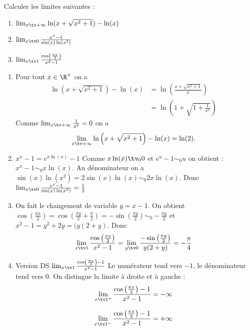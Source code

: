 



\begin{exercice}
Calculer les limites suivantes : 

\begin{enumerate}
\item $\lim_{x\tv+\infty} \ln(x+\sqrt{x^2 +1}) -\ln(x)$\\

\item $\lim_{x\tv 0} \frac{x^x-1}{\sin(x)\ln(x^2)}$
\item $\lim_{x\tv 1} \frac{\cos\left(\frac{\pi x}{2}\right)}{x^2-1}$
\end{enumerate}
\end{exercice}



\begin{correction}
\begin{enumerate}

\item  Pour tout $x\in \R^+$ on a 
\begin{align*}
 \ln\left(x+\sqrt{x^2+1}\right) -\ln(x)  
							&= \ln\left(\frac{x+\sqrt{x^2+1}}{x}\right)  \\
							&= \ln\left(1+\sqrt{1+\frac{1}{x^2}}\right)  
\end{align*}
Comme $\lim_{x\tv+\infty} \frac{1}{x^2}=0$ on a 
$$\lim_{x\tv+\infty} \ln\left(x+\sqrt{x^2+1}\right) -\ln(x)  =\ln(2).$$

\item $x^x-1 = e^{x\ln(x) }-1 $ Comme $x\ln(x)\tv_0 0 $ et $e^u-1 \sim_0 u$  on obtient : $x^x-1 \sim_0 x\ln(x)$.
Au dénominateur on a  $\sin(x )\ln(x^2) =2\sin(x)\ln(x) \sim_0 2x \ln(x)$. 
Donc $\lim_{x\tv 0} \frac{x^x-1}{\sin(x)\ln(x^2)} = \frac{1}{2}$

\item On fait le changement de variable $y=x-1$. On obtient 
$\cos\left(\frac{\pi x}{2}\right) = \cos\left( \frac{\pi y}{2} +\frac{\pi}{2} \right) = -\sin\left(\frac{\pi y}{2}\right)\sim_0 -\frac{\pi y}{2}$
et $x^2 - 1 = y^2 +2y=(y(2+y) $. Donc 
$$\lim_{x\tv 1} \frac{\cos\left(\frac{\pi x}{2}\right) }{x^2-1}= \lim_{y\tv 0} \frac{ -\sin\left(\frac{\pi y}{2}\right)}{y(2+y)} = -\frac{\pi }{4}$$


\item Version DS $\lim_{x\tv 1} \frac{\cos\left(\frac{\pi x}{2}\right) - 1}{x^2-1}$
Le numérateur tend vers $-1$, le dénominateur tend vers $0$. On distingue la limite à droite et à gauche : 
$$\lim_{x\tv 1^+} \frac{\cos\left(\frac{\pi x}{2}\right) - 1}{x^2-1}= -\infty$$

$$\lim_{x\tv 1^-} \frac{\cos\left(\frac{\pi x}{2}\right) - 1}{x^2-1}= +\infty$$


\end{enumerate}
\end{correction}